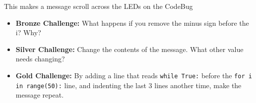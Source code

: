 \documentclass{geocraft-worksheet}
\begin{document}
\noindent This makes a message scroll across the LEDs on the CodeBug

\begin{itemize}
\item\textbf{Bronze Challenge:} What happens if you remove the minus sign before the i? Why?

\item\textbf{Silver Challenge:} Change the contents of the message. What other value needs changing?

\item\textbf{Gold Challenge:} By adding a line that reads \lstinline{while True:} before the 
        \lstinline{for i in range(50):} line, and indenting the last 3 lines another time, make the message repeat. 

\end{itemize}
\end{document}
